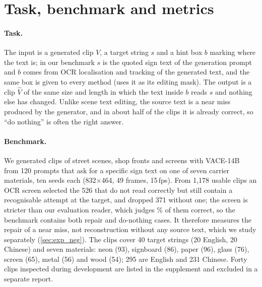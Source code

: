 \section{Task, benchmark and metrics}
\label{sec:task}

\paragraph{Task.} The input is a generated clip $V$, a target string $s$ and a hint box $b$ marking where the text is; in our benchmark $s$ is the quoted sign text of the generation prompt and $b$ comes from OCR localisation and tracking of the generated text, and the same box is given to every method (\steer uses it as its editing mask). The output is a clip $\hat V$ of the same size and length in which the text inside $b$ reads $s$ and nothing else has changed. Unlike scene text editing, the source text is a near miss produced by the generator, and in about half of the clips it is already correct, so ``do nothing'' is often the right answer.

\paragraph{Benchmark.} We generated clips of street scenes, shop fronts and screens with VACE-14B~\cite{jiang2025vace} from 120 prompts that ask for a specific sign text on one of seven carrier materials, ten seeds each (832$\times$464, 49 frames, 15\,fps). From 1{,}178 usable clips an OCR screen selected the 526 that do not read correctly but still contain a recognisable attempt at the target, and dropped 371 without one; the screen is stricter than our evaluation reader, which judges \rOrigRead\% of them correct, so the benchmark contains both repair and do-nothing cases. It therefore measures the repair of a near miss, not reconstruction without any source text, which we study separately (\cref{sec:exp_neg}). The clips cover 40 target strings (20 English, 20 Chinese) and seven materials: neon (93), signboard (86), paper (96), glass (76), screen (65), metal (56) and wood (54); 295 are English and 231 Chinese. Forty clips inspected during development are listed in the supplement and excluded in a separate report.

